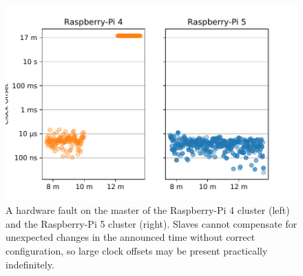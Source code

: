 \begin{figure}
    \includegraphics[width=\linewidth]{res/generated/fault/hardware/master_cluster_comparison.pdf}
    \caption{A hardware fault on the master of the Raspberry-Pi 4 cluster (left) and the Raspberry-Pi 5 cluster (right). Slaves cannot compensate for unexpected changes in the announced time without correct configuration, so large clock offsets may be present practically indefinitely.}
    \label{fig:hardware_fault_master}
\end{figure}


